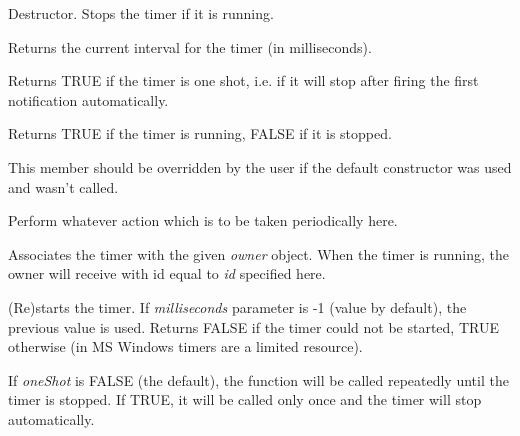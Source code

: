 

Destructor. Stops the timer if it is running.



Returns the current interval for the timer (in milliseconds).

\label{wxtimerisoneshot}


Returns TRUE if the timer is one shot, i.e. if it will stop after firing the
first notification automatically.

\label{wxtimerisrunning}


Returns TRUE if the timer is running, FALSE if it is stopped.

\label{wxtimernotify}


This member should be overridden by the user if the default constructor was
used and  wasn't called.

Perform whatever action which is to be taken periodically here.

\label{wxtimersetowner}


Associates the timer with the given {\it owner} object. When the timer is
running, the owner will receive  with
id equal to {\it id} specified here.

\label{wxtimerstart}


(Re)starts the timer. If {\it milliseconds} parameter is -1 (value by default),
the previous value is used. Returns FALSE if the timer could not be started,
TRUE otherwise (in MS Windows timers are a limited resource).

If {\it oneShot} is FALSE (the default), the  
function will be called repeatedly until the timer is stopped. If TRUE,
it will be called only once and the timer will stop automatically.

